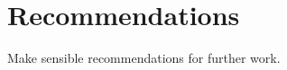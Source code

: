 \chapter{Recommendations}
\label{ch_recommendations}

Make sensible recommendations for further work. \cite{Knight2013}

